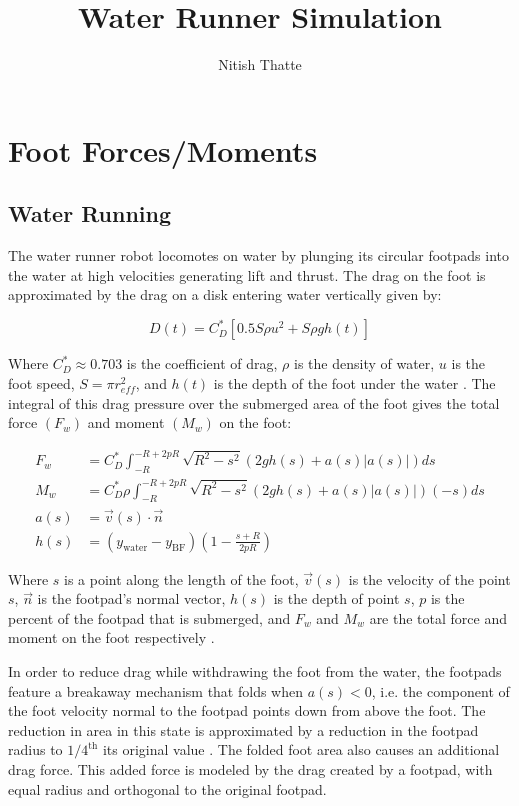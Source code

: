 \documentclass[letterpaper]{article}
\title{Water Runner Simulation}
\author{Nitish Thatte}
\begin{document}
\maketitle

\section{Foot Forces/Moments}
\subsection{Water Running}
The water runner robot locomotes on water by plunging its circular footpads into the water at high velocities generating lift and thrust. The drag on the foot is approximated by the drag on a disk entering water vertically given by:

\begin{equation}
	D(t) = C_D^* [0.5 S \rho u^2 + S \rho g h(t)]
\end{equation}

\noindent Where $C_D^* \approx 0.703$ is the coefficient of drag, $\rho$ is the density of water, $u$ is the foot speed, $S = \pi r_{eff}^2$, and $h(t)$ is the depth of the foot under the water \cite{Glasheen1996a}. The integral of this drag pressure over the submerged area of the foot gives the total force $(F_w)$ and moment $(M_w)$ on the foot:

\begin{align}
F_w &= C_D^* \int_{-R}^{-R+2pR} \sqrt{R^2 - s^2} (2gh(s) + a(s)|a(s)|) ds \label{eq:footF}\\
M_w &= C_D^* \rho \int_{-R}^{-R + 2pR} \sqrt{R^2 - s^2} (2gh(s) + a(s)|a(s)|)(-s) ds \label{eq:footM} \\
a(s) &= \vec{v}(s) \cdot \vec{n} \\
h(s) &= (y_\mathrm{water} - y_\mathrm{BF} ) \left( 1 - \frac{s + R}{2 p R} \right)
\end{align}

\noindent Where $s$ is a point along the length of the foot, $\vec{v}(s)$ is the velocity of the point $s$, $\vec{n}$ is the footpad's normal vector, $h(s)$ is the depth of point $s$, $p$ is the percent of the footpad that is submerged, and $F_w$ and $M_w$ are the total force and moment on the foot respectively \cite{Floyd2008}.

In order to reduce drag while withdrawing the foot from the water, the footpads feature a breakaway mechanism that folds when $a(s) < 0$, i.e. the component of the foot velocity normal to the footpad points down from above the foot. The reduction in area in this state is approximated by a reduction in the footpad radius to $1/4^\textrm{th}$ its original value \cite{Floyd2009}. The folded foot area also causes an additional drag force. This added force is modeled by the drag created by a footpad, with equal radius and orthogonal to the original footpad.
\end{document}
